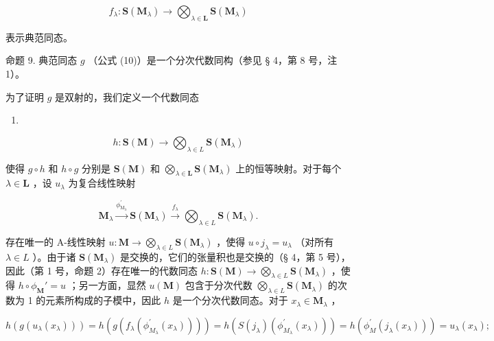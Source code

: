 \[
f _ {\lambda} \colon \mathbf {S} (\mathbf {M} _ {\lambda}) \rightarrow \bigotimes_ {\lambda \in \mathbf {L}} \mathbf {S} (\mathbf {M} _ {\lambda})
\]

表示典范同态。

命题 9. 典范同态 \(g\) （公式 (10)）是一个分次代数同构（参见 § 4，第 8 号，注 1）。

为了证明 \(g\) 是双射的，我们定义一个代数同态

\begin{enumerate}
\def\labelenumi{(\arabic{enumi})}
\setcounter{enumi}{10}
\tightlist
\item
\end{enumerate}

\[
h \colon \mathbf {S} (\mathbf {M}) \rightarrow \bigotimes_ {\lambda \in L} \mathbf {S} (\mathbf {M} _ {\lambda})
\]

使得 \(g \circ h\) 和 \(h \circ g\) 分别是 \(\mathbf{S}(\mathbf{M})\) 和 \(\bigotimes_{\lambda \in \mathbf{L}} \mathbf{S}(\mathbf{M}_{\lambda})\) 上的恒等映射。对于每个 \(\lambda \in \mathbf{L}\) ，设 \(u_{\lambda}\) 为复合线性映射

\[
\mathbf {M} _ {\lambda} \xrightarrow {\phi_ {\mathrm{M} _ {\lambda}} ^ {\prime}} \mathbf {S} (\mathbf {M} _ {\lambda}) \xrightarrow {f _ {\lambda}} \bigotimes_ {\lambda \in L} \mathbf {S} (\mathbf {M} _ {\lambda}).
\]

存在唯一的 A-线性映射 \(u: \mathbf{M} \to \bigotimes_{\lambda \in L} \mathbf{S}(\mathbf{M}_{\lambda})\) ，使得 \(u \circ j_{\lambda} = u_{\lambda}\) （对所有 \(\lambda \in L\) ）。由于诸 \(\mathbf{S}(\mathbf{M}_{\lambda})\) 是交换的，它们的张量积也是交换的（§ 4，第 5 号），因此（第 1 号，命题 2）存在唯一的代数同态 \(h: \mathbf{S}(\mathbf{M}) \to \bigotimes_{\lambda \in L} \mathbf{S}(\mathbf{M}_{\lambda})\) ，使得 \(h \circ \phi_{\mathbf{M}}' = u\) ；另一方面，显然 \(u(\mathbf{M})\) 包含于分次代数 \(\bigotimes_{\lambda \in L} \mathbf{S}(\mathbf{M}_{\lambda})\) 的次数为 1 的元素所构成的子模中，因此 \(h\) 是一个分次代数同态。对于 \(x_{\lambda} \in \mathbf{M}_{\lambda}\) ，

\[
h \left(g \left(u _ {\lambda} \left(x _ {\lambda}\right)\right)\right) = h \left(g \left(f _ {\lambda} \left(\phi_ {M _ {\lambda}} ^ {\prime} \left(x _ {\lambda}\right)\right)\right)\right) = h \left(S \left(j _ {\lambda}\right) \left(\phi_ {M _ {\lambda}} ^ {\prime} \left(x _ {\lambda}\right)\right)\right) = h \left(\phi_ {M} ^ {\prime} \left(j _ {\lambda} \left(x _ {\lambda}\right)\right)\right) = u _ {\lambda} \left(x _ {\lambda}\right);
\]

